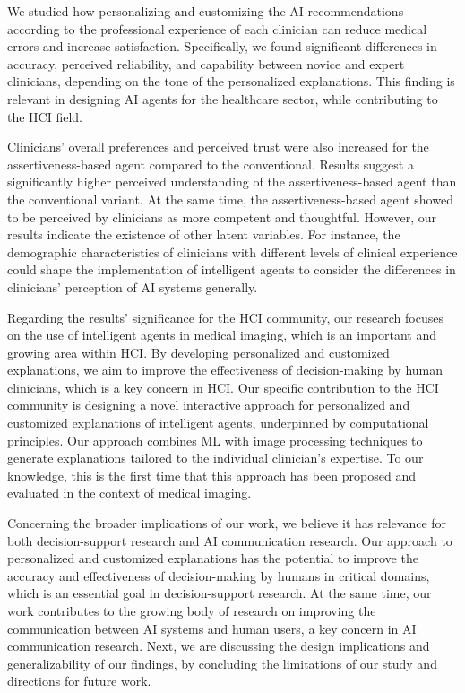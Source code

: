 We studied how personalizing and customizing the \ac{AI} recommendations according to the professional experience of each clinician can reduce medical errors and increase satisfaction.
Specifically, we found significant differences in accuracy, perceived reliability, and capability between novice and expert clinicians, depending on the tone of the personalized explanations.
This finding is relevant in designing \ac{AI} agents for the healthcare sector, while contributing to the \ac{HCI} field.

Clinicians' overall preferences and perceived trust were also increased for the assertiveness-based agent compared to the conventional.
Results suggest a significantly higher perceived understanding of the assertiveness-based agent than the conventional variant.
At the same time, the assertiveness-based agent showed to be perceived by clinicians as more competent and thoughtful.
However, our results indicate the existence of other latent variables.
For instance, the demographic characteristics of clinicians with different levels of clinical experience could shape the implementation of intelligent agents to consider the differences in clinicians' perception of \ac{AI} systems generally.

Regarding the results' significance for the \ac{HCI} community, our research focuses on the use of intelligent agents in medical imaging, which is an important and growing area within \ac{HCI}.
By developing personalized and customized explanations, we aim to improve the effectiveness of decision-making by human clinicians, which is a key concern in \ac{HCI}.
Our specific contribution to the \ac{HCI} community is designing a novel interactive approach for personalized and customized explanations of intelligent agents, underpinned by computational principles.
Our approach combines \ac{ML} with image processing techniques to generate explanations tailored to the individual clinician's expertise.
To our knowledge, this is the first time that this approach has been proposed and evaluated in the context of medical imaging.

Concerning the broader implications of our work, we believe it has relevance for both decision-support research and \ac{AI} communication research.
Our approach to personalized and customized explanations has the potential to improve the accuracy and effectiveness of decision-making by humans in critical domains, which is an essential goal in decision-support research.
At the same time, our work contributes to the growing body of research on improving the communication between \ac{AI} systems and human users, a key concern in \ac{AI} communication research.
Next, we are discussing the design implications and generalizability of our findings, by concluding the limitations of our study and directions for future work.

